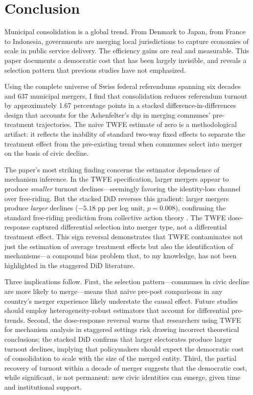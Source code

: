 \documentclass[12pt]{article}
\begin{document}
\section{Conclusion}

Municipal consolidation is a global trend. From Denmark to Japan, from France to Indonesia, governments are merging local jurisdictions to capture economies of scale in public service delivery. The efficiency gains are real and measurable. This paper documents a democratic cost that has been largely invisible, and reveals a selection pattern that previous studies have not emphasized.

Using the complete universe of Swiss federal referendums spanning six decades and 637 municipal mergers, I find that consolidation reduces referendum turnout by approximately 1.67 percentage points in a stacked difference-in-differences design that accounts for the Ashenfelter's dip in merging communes' pre-treatment trajectories. The naive TWFE estimate of zero is a methodological artifact: it reflects the inability of standard two-way fixed effects to separate the treatment effect from the pre-existing trend when communes select into merger on the basis of civic decline.

The paper's most striking finding concerns the estimator dependence of mechanism inference. In the TWFE specification, larger mergers appear to produce \textit{smaller} turnout declines---seemingly favoring the identity-loss channel over free-riding. But the stacked DiD reverses this gradient: larger mergers produce \textit{larger} declines ($-5.18$ pp per log unit, $p = 0.008$), confirming the standard free-riding prediction from collective action theory \citep{olson1965logic}. The TWFE dose-response captured differential selection into merger type, not a differential treatment effect. This sign reversal demonstrates that TWFE contaminates not just the estimation of average treatment effects but also the identification of mechanisms---a compound bias problem that, to my knowledge, has not been highlighted in the staggered DiD literature.

Three implications follow. First, the selection pattern---communes in civic decline are more likely to merge---means that naive pre-post comparisons in any country's merger experience likely understate the causal effect. Future studies should employ heterogeneity-robust estimators that account for differential pre-trends. Second, the dose-response reversal warns that researchers using TWFE for mechanism analysis in staggered settings risk drawing incorrect theoretical conclusions; the stacked DiD confirms that larger electorates produce larger turnout declines, implying that policymakers should expect the democratic cost of consolidation to scale with the size of the merged entity. Third, the partial recovery of turnout within a decade of merger suggests that the democratic cost, while significant, is not permanent: new civic identities can emerge, given time and institutional support.
\end{document}
